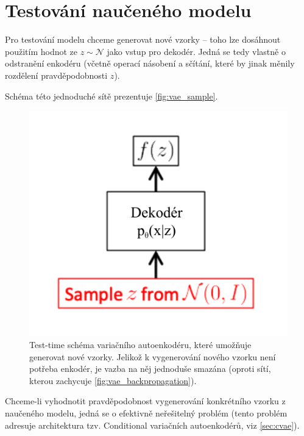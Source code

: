 \section{Testování naučeného modelu}
Pro testování modelu chceme generovat nové vzorky – toho lze dosáhnout použitím hodnot ze $z \sim \mathcal{N}$ jako vstup pro dekodér.
Jedná se tedy vlastně o odstranění enkodéru (včetně operací násobení a sčítání, které by jinak měnily rozdělení pravděpodobnosti $z$).

Schéma této jednoduché sítě prezentuje \autoref{fig:vae_sample}.

\begin{figure}[H]
    \centering
    \includegraphics{figures/vae_sample.pdf}
    \caption{Test-time schéma variačního autoenkodéru, které umožňuje generovat nové vzorky. Jelikož k vygenerování nového vzorku není potřeba enkodér, je vazba na něj jednoduše smazána (oproti sítí, kterou zachycuje \autoref{fig:vae_backpropagation}).}
    \label{fig:vae_sample}
\end{figure}

Chceme-li vyhodnotit pravděpodobnost vygenerování konkrétního vzorku z naučeného modelu, jedná se o efektivně neřešitelný problém (tento problém adresuje architektura tzv. Conditional variačních autoenkodérů, viz \autoref{sec:cvae}).